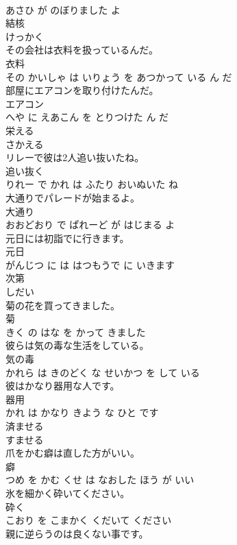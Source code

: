 \documentclass[8pt]{extreport}
\begin{document}
\begin{CJK}{UTF8}{min}
\\	あさひ が のぼりました よ			
\\	結核	
\\	けっかく			
\\	その会社は衣料を扱っているんだ。	
\\	衣料 
\\	その かいしゃ は いりょう を あつかって いる ん だ			
\\	部屋にエアコンを取り付けたんだ。	
\\	エアコン 
\\	へや に えあこん を とりつけた ん だ			
\\	栄える	
\\	さかえる			
\\	リレーで彼は2人追い抜いたね。	
\\	追い抜く 
\\	りれー で かれ は ふたり おいぬいた ね			
\\	大通りでパレードが始まるよ。	
\\	大通り 
\\	おおどおり で ぱれーど が はじまる よ			
\\	元日には初詣でに行きます。	
\\	元日 
\\	がんじつ に は はつもうで に いきます			
\\	次第	
\\	しだい			
\\	菊の花を買ってきました。	
\\	菊 
\\	きく の はな を かって きました			
\\	彼らは気の毒な生活をしている。	
\\	気の毒 
\\	かれら は きのどく な せいかつ を して いる			
\\	彼はかなり器用な人です。	
\\	器用 
\\	かれ は かなり きよう な ひと です			
\\	済ませる	
\\	すませる			
\\	爪をかむ癖は直した方がいい。	
\\	癖 
\\	つめ を かむ くせ は なおした ほう が いい			
\\	氷を細かく砕いてください。	
\\	砕く 
\\	こおり を こまかく くだいて ください			
\\	親に逆らうのは良くない事です。	

\end{CJK}
\end{document}
